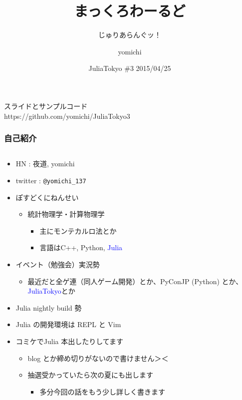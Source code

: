\documentclass[dvipdfmx]{beamer}
\title{まっくろわーるど}
\subtitle{じゅりあらんぐッ！}
\author{yomichi}
\date{JuliaTokyo \#3 2015/04/25}
\newcommand{\textblue}[1]{\textcolor{blue}{#1}}
\begin{document}
\begin{frame}
  \titlepage
  スライドとサンプルコード \\ 
  https://github.com/yomichi/JuliaTokyo3
\end{frame}

\begin{frame}[containsverbatim]
  \frametitle{自己紹介}
  \begin{columns}
    \begin{column}{.8\linewidth}
  \begin{itemize}
    \item HN : 夜道, yomichi
    \item twitter : \verb|@yomichi_137|
    \item ぽすどくにねんせい
      \begin{itemize}
        \item 統計物理学・計算物理学
        \begin{itemize}
          \item 主にモンテカルロ法とか
          \item 言語はC++, Python, \textblue{Julia}
        \end{itemize}
      \end{itemize}
    \item イベント（勉強会）実況勢
      \begin{itemize}
        \item 最近だと全ゲ連（同人ゲーム開発）とか、PyConJP (Python) とか、\textblue{JuliaTokyo}とか
      \end{itemize}
    \item Julia nightly build 勢
    \item Julia の開発環境は REPL と Vim
    \item コミケでJulia 本出したりしてます
      \begin{itemize}
        \item blog とか締め切りがないので書けません＞＜
        \item 抽選受かっていたら次の夏にも出します
          \begin{itemize}
            \item 多分今回の話をもう少し詳しく書きます
          \end{itemize}
      \end{itemize}
  \end{itemize}
\end{column}
\begin{column}{.3\linewidth}

\end{column}
\end{columns}
\end{frame}
\end{document}
